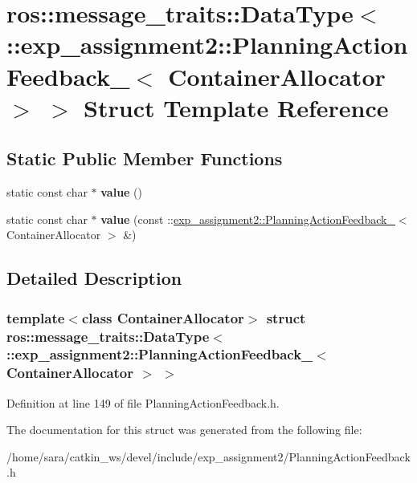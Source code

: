 \hypertarget{structros_1_1message__traits_1_1DataType_3_01_1_1exp__assignment2_1_1PlanningActionFeedback___3_01ContainerAllocator_01_4_01_4}{}\section{ros\+:\+:message\+\_\+traits\+:\+:Data\+Type$<$ \+:\+:exp\+\_\+assignment2\+:\+:Planning\+Action\+Feedback\+\_\+$<$ Container\+Allocator $>$ $>$ Struct Template Reference}
\label{structros_1_1message__traits_1_1DataType_3_01_1_1exp__assignment2_1_1PlanningActionFeedback___3_01ContainerAllocator_01_4_01_4}
\subsection*{Static Public Member Functions}
\begin{DoxyCompactItemize}
\item 
\mbox{\label{structros_1_1message__traits_1_1DataType_3_01_1_1exp__assignment2_1_1PlanningActionFeedback___3_01ContainerAllocator_01_4_01_4_a6692a8b48f9357730c81da27da058eb0}} 
static const char $\ast$ {\bfseries value} ()
\item 
\mbox{\label{structros_1_1message__traits_1_1DataType_3_01_1_1exp__assignment2_1_1PlanningActionFeedback___3_01ContainerAllocator_01_4_01_4_a6bcf8aa3134e798dc7db318cf52ee24a}} 
static const char $\ast$ {\bfseries value} (const \+::\hyperlink{structexp__assignment2_1_1PlanningActionFeedback__}{exp\+\_\+assignment2\+::\+Planning\+Action\+Feedback\+\_\+}$<$ Container\+Allocator $>$ \&)
\end{DoxyCompactItemize}


\subsection{Detailed Description}
\subsubsection*{template$<$class Container\+Allocator$>$\newline
struct ros\+::message\+\_\+traits\+::\+Data\+Type$<$ \+::exp\+\_\+assignment2\+::\+Planning\+Action\+Feedback\+\_\+$<$ Container\+Allocator $>$ $>$}



Definition at line 149 of file Planning\+Action\+Feedback.\+h.



The documentation for this struct was generated from the following file\+:\begin{DoxyCompactItemize}
\item 
/home/sara/catkin\+\_\+ws/devel/include/exp\+\_\+assignment2/Planning\+Action\+Feedback.\+h\end{DoxyCompactItemize}
